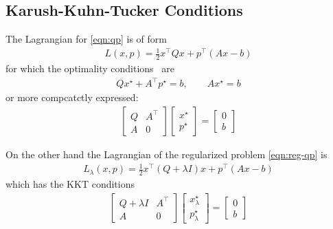 \documentclass[12pt]{article}
\begin{document}
\subsection{Karush-Kuhn-Tucker Conditions}
The Lagrangian for \eqref{eqn:qp} is of form
\begin{align*}
  L(x, p) = \frac{1}{2} x^\top Q x + p^\top (Ax - b)
\end{align*}
for which the
optimality conditions~\cite{boyd2004convex} are
\begin{align*}
  Q x^\star + A^\top p^\star = b,
    \qquad Ax^\star = b
\end{align*}
or more compcatctly expressed:
\begin{align}
  \begin{bmatrix} Q & A^\top \\ A & 0 \end{bmatrix}
  \begin{bmatrix} x^\star \\ p^\star \end{bmatrix}
  = \begin{bmatrix} 0 \\ b \end{bmatrix}
    \label{eqn:kkt-qp}
\end{align}

On the other hand the Lagrangian of the
regularized problem \eqref{eqn:reg-qp} is
\begin{align*}
  L_\lambda (x, p) = \frac{1}{2} x^\top (Q + \lambda I) x + p^\top (Ax - b)
\end{align*}
which has the KKT conditions
\begin{align}
  \begin{bmatrix} Q + \lambda I & A^\top \\ A & 0 \end{bmatrix}
  \begin{bmatrix} x_\lambda ^\star \\ p_\lambda ^\star \end{bmatrix}
    = \begin{bmatrix} 0 \\ b \end{bmatrix}
    \label{eqn:kkt-reg-qp}
\end{align}
\end{document}
